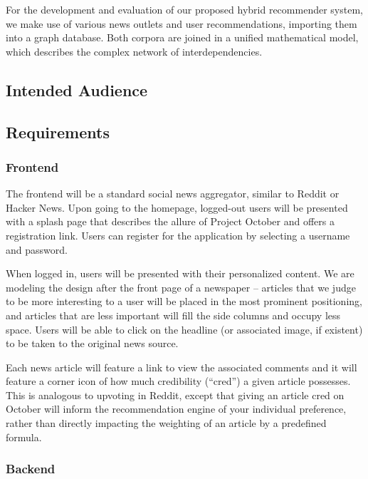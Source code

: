 \documentclass[11pt,letterpaper]{article}
\begin{document}
For the development and evaluation of our proposed hybrid recommender system, we make use of various news outlets and user recommendations, importing them into a graph database.
Both corpora are joined in a unified mathematical model, which describes the complex network of interdependencies.

\subsection{Intended Audience}
\subsection{Requirements}
\subsubsection{Frontend}
The frontend will be a standard social news aggregator, similar to Reddit or Hacker News.
Upon going to the homepage, logged-out users will be presented with a splash page that describes the allure of Project October and offers a registration link.
Users can register for the application by selecting a username and password.

When logged in, users will be presented with their personalized content.
We are modeling the design after the front page of a newspaper -- articles that we judge to be more interesting to a user will be placed in the most prominent positioning, and articles that are less important will fill the side columns and occupy less space.
Users will be able to click on the headline (or associated image, if existent) to be taken to the original news source.

Each news article will feature a link to view the associated comments and it will feature a corner icon of how much credibility (``cred'') a given article possesses.
This is analogous to upvoting in Reddit, except that giving an article cred on October will inform the recommendation engine of your individual preference, rather than directly impacting the weighting of an article by a predefined formula.

\subsubsection{Backend}
\end{document}
